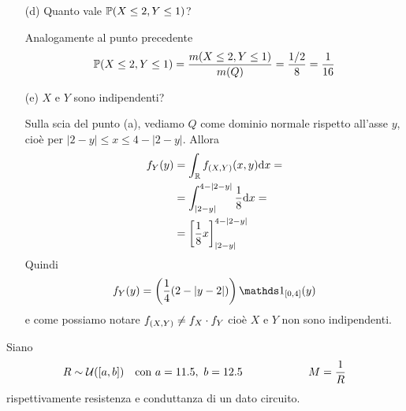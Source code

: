 \begin{enumerate}
\item [(d)] Quanto vale $\mathbb{P}(X\leq 2,Y\leq 1)$?

Analogamente al punto precedente
\[
\mathbb{P}(X\leq 2,Y\leq 1)=\frac{m(X\leq 2,Y\leq 1)}{m(Q)}=\frac{1/2}{8}=\frac{1}{16}
\]

\item [(e)] $X$ e $Y$ sono indipendenti?

Sulla scia del punto (a), vediamo $Q$ come dominio normale rispetto all'asse $y$, cioè per $|2-y|\leq x\leq 4-|2-y|$. Allora
\begin{gather*}
\begin{aligned}
f_Y(y)&=\int_{\mathbb{R}}f_{(X,Y)}(x,y)\mathrm{d} x=\\
&=\int_{|2-y|}^{4-|2-y|}\frac{1}{8}\mathrm{d} x=\\
&=\left[\frac{1}{8} x  \right]_{|2-y|}^{4-|2-y|}
\end{aligned}
\end{gather*}
Quindi
\[
f_Y(y)=\left(\frac{1}{4}(2-|y-2|)  \right)\Ind_{[0,4]}(y)
\]
e come possiamo notare $f_{(X,Y)}\neq f_X\cdot f_Y$ cioè $X$ e $Y$ non sono indipendenti.

\end{enumerate}

\Soluzione{}
Siano
\[
R\sim\mathcal{U}([a,b])\quad \text{con }a=11.5,\ b=12.5\qquad\qquad\qquad M=\frac{1}{R}
\]
rispettivamente resistenza e conduttanza di un dato circuito.


